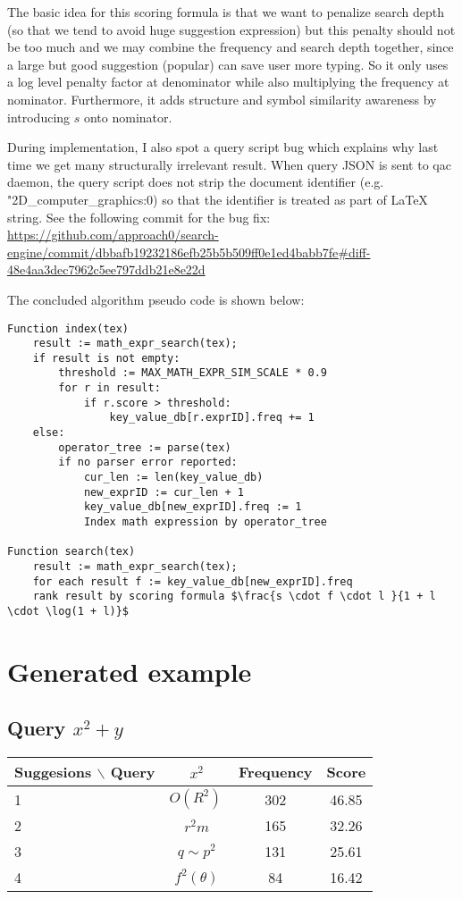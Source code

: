 \documentclass[12pt]{article} %
\begin{document}
The basic idea for this scoring formula is that we want to penalize search depth (so that we tend to avoid huge suggestion expression) but this penalty should not be too much and we may combine the frequency and search depth together, since a large but good suggestion (popular) can save user more typing. So it only uses a log level penalty factor at denominator while also multiplying the frequency at nominator. Furthermore, it adds structure and symbol similarity awareness by introducing $s$ onto nominator.

During implementation, I also spot a query script bug which explains why last time we get many structurally irrelevant result.
When query JSON is sent to qac daemon, the query script does not strip the document identifier (e.g. "2D\_computer\_graphics:0) so that the identifier is treated as part of LaTeX string.
See the following commit for the bug fix:
\url{https://github.com/approach0/search-engine/commit/dbbafb19232186efb25b5b509ff0e1ed4babb7fe#diff-48e4aa3dec7962c5ee797ddb21e8e22d}

\pagebreak
The concluded algorithm pseudo code is shown below:
\vspace{2cm}

\begin{lstlisting}
Function index(tex)
    result := math_expr_search(tex);
    if result is not empty:
        threshold := MAX_MATH_EXPR_SIM_SCALE * 0.9
        for r in result:
            if r.score > threshold:
                key_value_db[r.exprID].freq += 1
    else:
        operator_tree := parse(tex)
        if no parser error reported:
            cur_len := len(key_value_db)
            new_exprID := cur_len + 1
            key_value_db[new_exprID].freq := 1
            Index math expression by operator_tree

Function search(tex)
    result := math_expr_search(tex);
    for each result f := key_value_db[new_exprID].freq
    rank result by scoring formula $\frac{s \cdot f \cdot l }{1 + l \cdot \log(1 + l)}$
\end{lstlisting}

\pagebreak
\section*{Generated example}

\subsection{Query $x^2+y$}
\begin{center}
\begin{tabular}{lccc}
Suggesions $\backslash$ Query  & $x^2 $ & Frequency & Score \\
\hline
 1 &  $ O(R^{2})\,\! $ & 302 & 46.85 \\
 2 &  $ r^{2}m $ & 165 & 32.26 \\
 3 &  $ q\sim p^{2} $ & 131 & 25.61 \\
 4 &  $ f^{2}(\theta) $ & 84 & 16.42 \\
\end{tabular}
\end{center}
\end{document}

